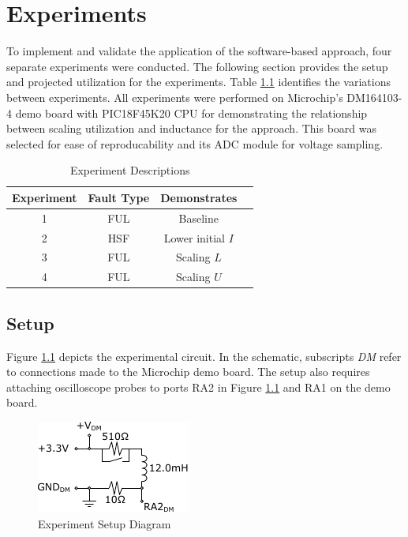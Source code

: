 \documentclass[11pt,compsoc,oneside]{report}
\begin{document}
\chapter{Experiments}\label{chap:experiments}
To implement and validate the application of the software-based approach, four separate experiments were conducted. The following section provides the setup and projected utilization for the experiments. Table \ref{tab:ExperimentDescriptions} identifies the variations between experiments. All experiments were performed on Microchip's DM164103-4 demo board with PIC18F45K20 CPU for demonstrating the relationship between scaling utilization and inductance for the approach. This board was selected for ease of reproducability and its ADC module for voltage sampling.
\begin{table}
	\centering	
	\bgroup
	\def\arraystretch{1.00}%
	\begin{tabular}{| c | c | c | c |}
  		\hline			
  		Experiment & Fault Type & Demonstrates\\ \hline \hline \cline{1-3}
  		1 & FUL & Baseline\\ \hline
  		2 & HSF & Lower initial $I$\\ \hline
  		3 & FUL & Scaling $L$\\ \hline
  		4 & FUL & Scaling $U$\\ \hline  
	\end{tabular}
	\egroup
    \caption{Experiment Descriptions}
    \label{tab:ExperimentDescriptions}
\end{table}
\section{Setup}
Figure \ref{fig:ExperimentSetup} depicts the experimental circuit. In the schematic, subscripts \textit{DM} refer to connections made to the Microchip demo board. The setup also requires attaching oscilloscope probes to ports RA2 in Figure \ref{fig:ExperimentSetup} and RA1 on the demo board.
\begin{figure}
	\centering
    \includegraphics[scale=1.50]{img/Experiment_Setup.pdf}
    \caption{Experiment Setup Diagram}
    \label{fig:ExperimentSetup}
\end{figure}
\end{document}
